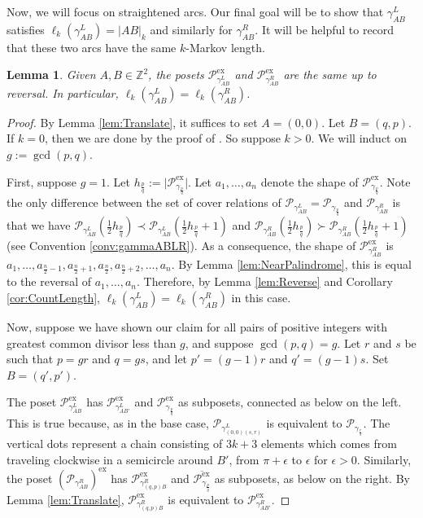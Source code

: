 \documentclass[12pt, letterpaper,table]{amsart}
\newtheorem{lemma}[theorem]{Lemma}
\theoremstyle{remark}
\newcommand{\fpq}{\frac{p}{q}}
\newcommand{\frs}{\frac{r}{s}}
\newcommand{\calP}{\mathcal{P}}
\newcommand{\exx}{\mathrm{ex}}
\begin{document}
Now, we will focus on straightened arcs. Our final goal will be to show that  $\gamma_{AB}^L$ satisfies $\ell_k(\gamma_{AB}^L) = \vert AB \vert_k$ and similarly for  $\gamma_{AB}^R$. It will be helpful to record that these two arcs have the same $k$-Markov length.


\begin{lemma}\label{lem:LeftAndRightEqual}
Given $A,B \in \mathbb{Z}^2$,  the posets $\calP^\exx_{\gamma_{AB}^L}$ and $\calP^\exx_{\gamma_{AB}^R}$ are the same up to reversal. In particular, $\ell_k(\gamma_{AB}^L) = \ell_k(\gamma_{AB}^R)$.
\end{lemma}

\begin{proof}
By Lemma \ref{lem:Translate}, it suffices to set $A = (0,0)$. Let $B = (q,p)$.  If $k = 0$, then we are done by the proof of \cite[Lemma 3.2]{LLRS}. 
So suppose $k >0$. We will induct on $g:=\gcd(p,q)$.

First, suppose $g = 1$. Let $h_\fpq:= \vert \calP^\exx_{\gamma_\fpq} \vert$.  Let  $a_1,\ldots,a_n$ denote the shape of $\calP_{\gamma_\fpq}^\exx$.   
Note the only  difference between the set of cover relations of $\calP_{\gamma_{AB}^L} = \calP_{\gamma_\fpq}$ and $\calP_{\gamma_{AB}^R}$ is that we have $\calP_{\gamma_{AB}^L}(\frac12 h_\fpq) \prec  \calP_{\gamma_{AB}^L}(\frac12 h_\fpq+1)$ and $\calP_{\gamma_{AB}^R}(\frac12 h_\fpq) \succ  \calP_{\gamma_{AB}^R}(\frac12 h_\fpq+1)$ (see Convention \ref{conv:gammaABLR}).
As a consequence,  the shape of $\calP_{\gamma_{AB}^R}^\exx$ is $a_1,\ldots,a_{\frac{n}{2}-1},a_{\frac{n}{2}+1},a_{\frac{n}{2}},a_{\frac{n}{2}+2},\ldots,a_n$.  By Lemma \ref{lem:NearPalindrome},  this is equal to the reversal of $a_1,\ldots, a_n$. Therefore,  by Lemma \ref{lem:Reverse} and Corollary  \ref{cor:CountLength}, $\ell_k(\gamma_{AB}^L) = \ell_k(\gamma_{AB}^R)$ in this case. 


Now, suppose we have shown our claim for all pairs of positive integers with greatest common divisor less than $g$, and suppose $\gcd(p,q) = g$.  Let $r$ and $s$ be such that $p = gr$ and $q = gs$,  and let $p' = (g-1)r$ and $q' = (g-1)s$. Set $B = (q',p')$. 

The poset $\calP_{\gamma_{AB}^L}^\exx$ has $\calP_{\gamma_{AB'}^L}^\exx$ and $\calP_{\gamma_\fpq}^\exx$ as subposets,  connected as below on the left. This is true because, as in the base case, $\calP_{\gamma_{(0,0)(s,r)}^L}$ is equivalent to $\calP_{\gamma_\frs}$. The vertical dots represent a chain consisting of $3k+3$ elements which comes from traveling clockwise in a semicircle around $B'$, from $ \pi + \epsilon$ to $\epsilon$ for $\epsilon > 0$. 
Similarly, the poset $(\calP_{\gamma_{AB}^R})^\exx$ has $\calP_{\gamma_{(q,p)B}^R}^\exx$ and $\overline{\calP_{\gamma_\fpq}^\exx}$ as subposets, as below on the right. By Lemma \ref{lem:Translate},  $\calP_{\gamma_{(q,p)B}^R}^\exx$ is equivalent to $\calP_{\gamma_{AB'}^R}^\exx$. 


\end{proof}
\end{document}
